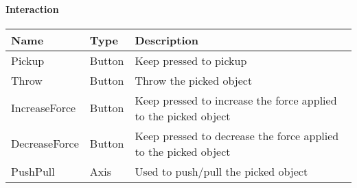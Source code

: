 \paragraph{Interaction}
\begin{center}
	\centering
	\begin{longtable}{ | l | l | p{9cm} |}
	\hline
	Name			&	Type	&	Description \\ \hline
	Pickup			&	Button	&	Keep pressed to pickup\\
	Throw			&	Button	&	Throw the picked object\\
	IncreaseForce	&	Button	&	Keep pressed to increase the force applied to the picked object\\
	DecreaseForce	&	Button	&	Keep pressed to decrease the force applied to the picked object\\
	PushPull		&	Axis	&	Used to push/pull the picked object\\
	\hline
	\end{longtable}
\end{center}
